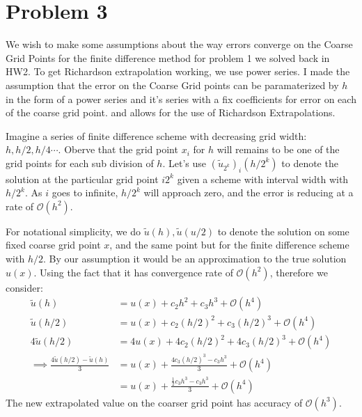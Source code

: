 \documentclass[]{article}
\begin{document}
\section*{Problem 3}
    \par\hspace{1.1em}
    We wish to make some assumptions about the way errors converge on the Coarse Grid Points for the finite difference method for problem 1 we solved back in HW2. To get Richardson extrapolation working, we use power series. I made the assumption that the error on the Coarse Grid points can be paramaterized by $h$ in the form of a power series and it's series with a fix coefficients for error on each of the coarse grid point. and allows for the use of Richardson Extrapolations. 
    \par
    Imagine a series of finite difference scheme with decreasing grid width: $h, h/2, h/4\cdots$. Oberve that the grid point $x_i$ for $h$ will remains to be one of the grid points for each sub division of $h$. Let's use $(\tilde{u}_{2^k})_i(h/2^{k})$ to denote the solution at the particular grid point $i2^k$ given a scheme with interval width with $h/2^k$. As $i$ goes to infinite, $h/2^k$ will approach zero, and the error is reducing at a rate of $\mathcal{O}(h^2)$. 
    \par
    For notational simplicity, we do $\tilde{u}(h), \tilde{u}(u/2)$ to denote the solution on some fixed coarse grid point $x$, and the same point but for the finite difference scheme with $h/2$. By our assumption it would be an approximation to the true solution $u(x)$. Using the fact that it has convergence rate of $\mathcal{O}(h^2)$, therefore we consider: 
    \begin{align*}\tag{3.1}\label{eqn:3.1}
        \tilde{u}(h) &= u(x) + c_2h^2 + c_3h^3 + \mathcal{O}(h^4)
        \\
        \tilde{u}(h/2) &= u(x) + c_2(h/2)^2 + c_3(h/2)^3 + \mathcal{O}(h^4)
        \\
        4\tilde{u}(h/2) &= 4u(x) + 4c_2(h/2)^2 + 4c_3(h/2)^3 + \mathcal{O}(h^4)
        \\
        \implies 
        \frac{4\tilde{u}(h/2) - \tilde{u}(h)}{3}
        &= 
        u(x) + \frac{4c_3(h/2)^3 - c_3h^3}{3} + \mathcal{O}(h^4)
        \\
        &= u(x) + \frac{
            \frac{1}{2}c_3h^3 - c_3 h^3
        }{3} + \mathcal{O}(h^4)
    \end{align*}
    The new extrapolated value on the coarser grid point has accuracy of $\mathcal{O}(h^3)$. 
\end{document}
